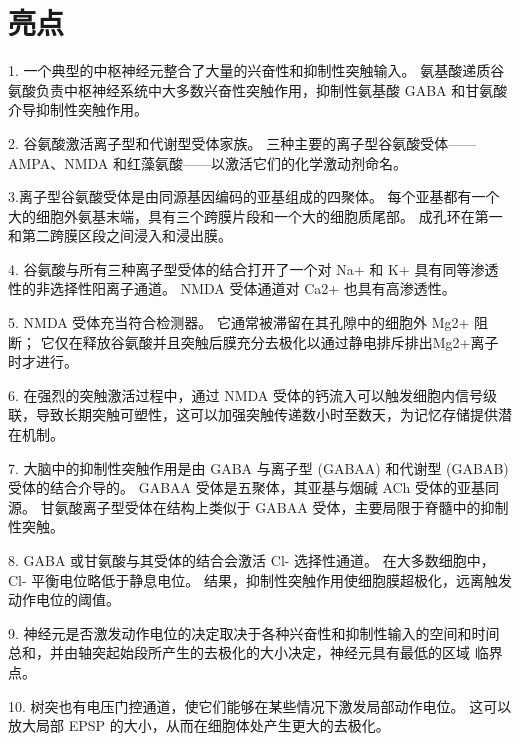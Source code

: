 \section{亮点}

1. 一个典型的中枢神经元整合了大量的兴奋性和抑制性突触输入。
氨基酸递质谷氨酸负责中枢神经系统中大多数兴奋性突触作用，抑制性氨基酸 GABA 和甘氨酸介导抑制性突触作用。 


2. 谷氨酸激活离子型和代谢型受体家族。
三种主要的离子型谷氨酸受体——AMPA、NMDA 和红藻氨酸——以激活它们的化学激动剂命名。 


3.离子型谷氨酸受体是由同源基因编码的亚基组成的四聚体。
每个亚基都有一个大的细胞外氨基末端，具有三个跨膜片段和一个大的细胞质尾部。
成孔环在第一和第二跨膜区段之间浸入和浸出膜。 


4. 谷氨酸与所有三种离子型受体的结合打开了一个对 Na+ 和 K+ 具有同等渗透性的非选择性阳离子通道。 
NMDA 受体通道对 Ca2+ 也具有高渗透性。


5. NMDA 受体充当符合检测器。
它通常被滞留在其孔隙中的细胞外 Mg2+ 阻断； 它仅在释放谷氨酸并且突触后膜充分去极化以通过静电排斥排出Mg2+离子时才进行。 


6. 在强烈的突触激活过程中，通过 NMDA 受体的钙流入可以触发细胞内信号级联，导致长期突触可塑性，这可以加强突触传递数小时至数天，为记忆存储提供潜在机制。 


7. 大脑中的抑制性突触作用是由 GABA 与离子型 (GABAA) 和代谢型 (GABAB) 受体的结合介导的。 
GABAA 受体是五聚体，其亚基与烟碱 ACh 受体的亚基同源。 甘氨酸离子型受体在结构上类似于 GABAA 受体，主要局限于脊髓中的抑制性突触。 


8. GABA 或甘氨酸与其受体的结合会激活 Cl- 选择性通道。 
在大多数细胞中，Cl- 平衡电位略低于静息电位。 结果，抑制性突触作用使细胞膜超极化，远离触发动作电位的阈值。 


9. 神经元是否激发动作电位的决定取决于各种兴奋性和抑制性输入的空间和时间总和，并由轴突起始段所产生的去极化的大小决定，神经元具有最低的区域 临界点。 


10. 树突也有电压门控通道，使它们能够在某些情况下激发局部动作电位。
这可以放大局部 EPSP 的大小，从而在细胞体处产生更大的去极化。


%




